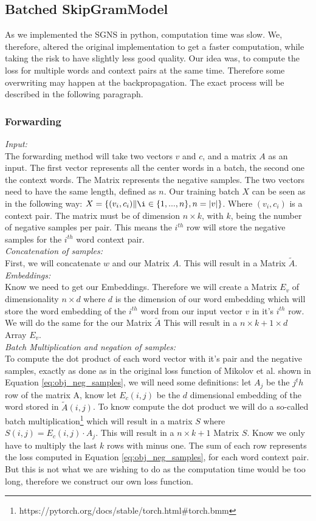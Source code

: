 \subsection{Batched SkipGramModel}\label{ssec:b_SGM}
As we implemented the SGNS in python, computation time was slow. We, therefore, altered the original implementation to get a faster computation, while taking the risk to have slightly less good quality. Our idea was, to compute the loss for multiple words and context pairs at the same time. Therefore some overwriting may happen at the backpropagation. The exact process will be described in the following paragraph. 
\subsubsection{Forwarding}
\textit{Input:}\\
The forwarding method will take two vectors $v$ and $c$, and a matrix $A$ as an input. The first vector represents all the center words in a batch, the second one the context words. The Matrix represents the negative samples. The two vectors need to have the same length, defined as $n$. Our training batch $X$ can be seen as in the following way:  $X = \{(v_i, c_i)\|\i \in \{1, ..., n\}, n = |v| \}$. Where $(v_i,c_i)$ is a context pair. The matrix must be of dimension $n \times k$, with $k$, being the number of negative samples per pair. This means the $i^{th}$ row will store the negative samples for the $i^{th}$ word context pair.\\
\textit{Concatenation of samples:}\\
First, we will concatenate $w$ and our Matrix $A$. This will result in a Matrix $\tilde{A}$.\\
\textit{Embeddings:}\\
 Know we need to get our Embeddings. Therefore we will create a Matrix $E_v$ of dimensionality $n \times d$ where $d$ is the dimension of our word embedding which will store the word embedding of the $i^{th}$ word from our input vector $v$ in it's $i^{th}$ row. We will do the same for the our Matrix $\tilde{A}$ This will result in a $n \times k+1 \times d$ Array $E_v$. \\
 \textit{Batch Multiplication and negation of samples:}\\ 
 To compute the dot product of each word vector with it's pair and the negative samples, exactly as done as in the original loss function of Mikolov et al. shown in Equation \ref{eq:obj_neg_samples}, we will need some definitions: let $A_j$ be the $j^th$ row of the matrix A, know let $E_c(i,j)$ be the $d$ dimensional embedding of the word stored in $\tilde{A}(i,j)$. To know compute the dot product we will do a so-called batch multiplication\footnote{https://pytorch.org/docs/stable/torch.html\#torch.bmm} which will result in a matrix $S$ where $S(i,j) = E_c(i,j) \cdot A_j$. This will result in a $n\times k+1$ Matrix $S$. Know we only have to multiply the last $k$ rows with minus one. The sum of each row represents the loss computed in Equation \ref{eq:obj_neg_samples}, for each word context pair. But this is not what we are wishing to do as the computation time would be too long, therefore we construct our own loss function. \\
